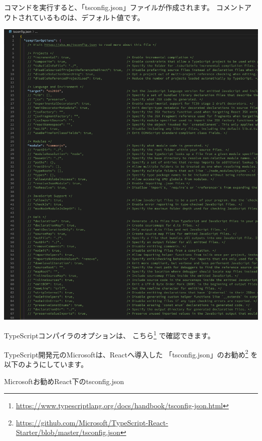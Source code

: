 コマンドを実行すると、「tsconfig.json」ファイルが作成されます。
コメントアウトされているものは、デフォルト値です。

\begin{reviewimage}%
\includegraphics[width=0.8\maxwidth]{./images/02-create-react-app/typescript04.png}%
\label{image:02-create-react-app:typescript04}
\end{reviewimage}

\clearpage


TypeScriptコンパイラのオプションは、
こちら\footnote{\url{https://www.typescriptlang.org/docs/handbook/tsconfig-json.html}}
で確認できます。

\vspace*{\baselineskip}

TypeScript開発元のMicrosoftは、Reactへ導入した
「tsconfig.json」のお勧め\footnote{\url{https://github.com/Microsoft/TypeScript-React-Starter/blob/master/tsconfig.json}}
を以下のようにしています。

\def\startercodeblockfontsize{}
\begin{starterprogram}[]{Microsoftお勧めReact下のtsconfig.json}\end{starterprogram}

